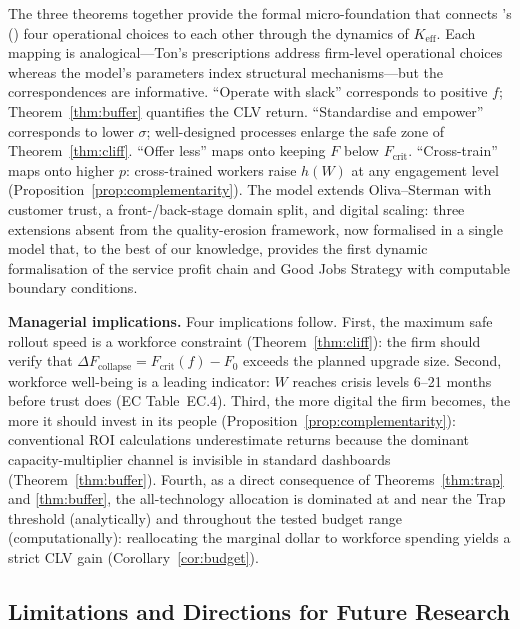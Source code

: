 \documentclass[msom,dblanonrev]{informs4}
\newcommand{\Keff}{K_{\mathrm{eff}}}
\begin{document}
The three theorems together provide the formal micro-foundation that connects \citeauthor{ton2014good}'s (\citeyear{ton2014good}) four operational choices to each other through the dynamics of $\Keff$. Each mapping is analogical---Ton's prescriptions address firm-level operational choices whereas the model's parameters index structural mechanisms---but the correspondences are informative. ``Operate with slack'' corresponds to positive $f$; Theorem~\ref{thm:buffer} quantifies the CLV return. ``Standardise and empower'' corresponds to lower $\sigma$; well-designed processes enlarge the safe zone of Theorem~\ref{thm:cliff}. ``Offer less'' maps onto keeping $F$ below $F_{\mathrm{crit}}$. ``Cross-train'' maps onto higher $p$: cross-trained workers raise $h(W)$ at any engagement level (Proposition~\ref{prop:complementarity}). The model extends Oliva--Sterman with customer trust, a front-/back-stage domain split, and digital scaling: three extensions absent from the quality-erosion framework, now formalised in a single model that, to the best of our knowledge, provides the first dynamic formalisation of the service profit chain \citep{heskett1994putting, heskett1997service} and Good Jobs Strategy \citep{ton2014good} with computable boundary conditions.

\medskip
\noindent\textbf{Managerial implications.} Four implications follow. First, the maximum safe rollout speed is a workforce constraint (Theorem~\ref{thm:cliff}): the firm should verify that $\Delta F_{\mathrm{collapse}} = F_{\mathrm{crit}}(f) - F_0$ exceeds the planned upgrade size. Second, workforce well-being is a leading indicator: $W$ reaches crisis levels 6--21 months before trust does (EC Table~EC.4). Third, the more digital the firm becomes, the more it should invest in its people (Proposition~\ref{prop:complementarity}): conventional ROI calculations underestimate returns because the dominant capacity-multiplier channel is invisible in standard dashboards (Theorem~\ref{thm:buffer}). Fourth, as a direct consequence of Theorems~\ref{thm:trap} and \ref{thm:buffer}, the all-technology allocation is dominated at and near the Trap threshold (analytically) and throughout the tested budget range (computationally): reallocating the marginal dollar to workforce spending yields a strict CLV gain (Corollary~\ref{cor:budget}).

\subsection{Limitations and Directions for Future Research}\label{sec:disc:limits}
\end{document}

